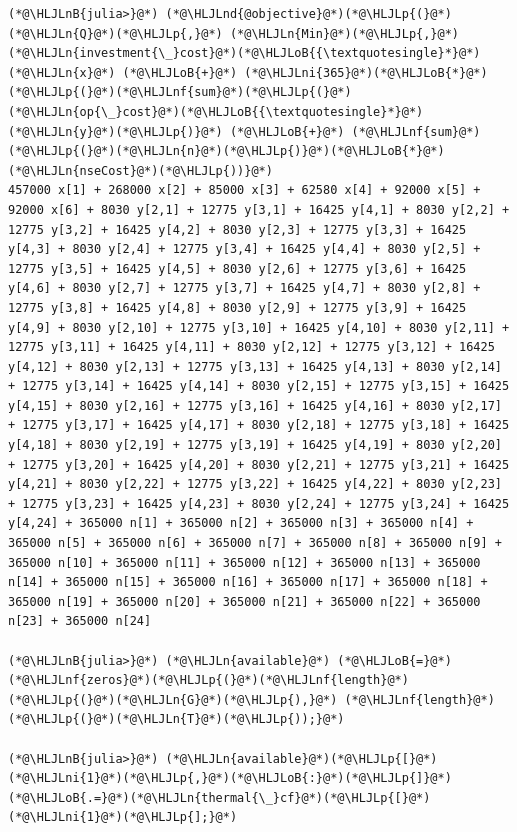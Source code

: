 \documentclass[12pt,a4paper]{article}
\newcommand{\HLJLn}[1]{#1}
\newcommand{\HLJLnd}[1]{\textcolor[RGB]{214,102,97}{#1}}
\newcommand{\HLJLnf}[1]{\textcolor[RGB]{66,102,213}{#1}}
\newcommand{\HLJLnB}[1]{\textcolor[RGB]{59,151,46}{#1}}
\newcommand{\HLJLni}[1]{\textcolor[RGB]{59,151,46}{#1}}
\newcommand{\HLJLoB}[1]{\textcolor[RGB]{102,102,102}{\textbf{#1}}}
\newcommand{\HLJLp}[1]{#1}
\begin{document}
\begin{lstlisting}
(*@\HLJLnB{julia>}@*) (*@\HLJLnd{@objective}@*)(*@\HLJLp{(}@*)(*@\HLJLn{Q}@*)(*@\HLJLp{,}@*) (*@\HLJLn{Min}@*)(*@\HLJLp{,}@*) (*@\HLJLn{investment{\_}cost}@*)(*@\HLJLoB{{\textquotesingle}*}@*) (*@\HLJLn{x}@*) (*@\HLJLoB{+}@*) (*@\HLJLni{365}@*)(*@\HLJLoB{*}@*)(*@\HLJLp{(}@*)(*@\HLJLnf{sum}@*)(*@\HLJLp{(}@*)(*@\HLJLn{op{\_}cost}@*)(*@\HLJLoB{{\textquotesingle}*}@*)(*@\HLJLn{y}@*)(*@\HLJLp{)}@*) (*@\HLJLoB{+}@*) (*@\HLJLnf{sum}@*)(*@\HLJLp{(}@*)(*@\HLJLn{n}@*)(*@\HLJLp{)}@*)(*@\HLJLoB{*}@*)(*@\HLJLn{nseCost}@*)(*@\HLJLp{))}@*)
457000 x[1] + 268000 x[2] + 85000 x[3] + 62580 x[4] + 92000 x[5] + 92000 x[6] + 8030 y[2,1] + 12775 y[3,1] + 16425 y[4,1] + 8030 y[2,2] + 12775 y[3,2] + 16425 y[4,2] + 8030 y[2,3] + 12775 y[3,3] + 16425 y[4,3] + 8030 y[2,4] + 12775 y[3,4] + 16425 y[4,4] + 8030 y[2,5] + 12775 y[3,5] + 16425 y[4,5] + 8030 y[2,6] + 12775 y[3,6] + 16425 y[4,6] + 8030 y[2,7] + 12775 y[3,7] + 16425 y[4,7] + 8030 y[2,8] + 12775 y[3,8] + 16425 y[4,8] + 8030 y[2,9] + 12775 y[3,9] + 16425 y[4,9] + 8030 y[2,10] + 12775 y[3,10] + 16425 y[4,10] + 8030 y[2,11] + 12775 y[3,11] + 16425 y[4,11] + 8030 y[2,12] + 12775 y[3,12] + 16425 y[4,12] + 8030 y[2,13] + 12775 y[3,13] + 16425 y[4,13] + 8030 y[2,14] + 12775 y[3,14] + 16425 y[4,14] + 8030 y[2,15] + 12775 y[3,15] + 16425 y[4,15] + 8030 y[2,16] + 12775 y[3,16] + 16425 y[4,16] + 8030 y[2,17] + 12775 y[3,17] + 16425 y[4,17] + 8030 y[2,18] + 12775 y[3,18] + 16425 y[4,18] + 8030 y[2,19] + 12775 y[3,19] + 16425 y[4,19] + 8030 y[2,20] + 12775 y[3,20] + 16425 y[4,20] + 8030 y[2,21] + 12775 y[3,21] + 16425 y[4,21] + 8030 y[2,22] + 12775 y[3,22] + 16425 y[4,22] + 8030 y[2,23] + 12775 y[3,23] + 16425 y[4,23] + 8030 y[2,24] + 12775 y[3,24] + 16425 y[4,24] + 365000 n[1] + 365000 n[2] + 365000 n[3] + 365000 n[4] + 365000 n[5] + 365000 n[6] + 365000 n[7] + 365000 n[8] + 365000 n[9] + 365000 n[10] + 365000 n[11] + 365000 n[12] + 365000 n[13] + 365000 n[14] + 365000 n[15] + 365000 n[16] + 365000 n[17] + 365000 n[18] + 365000 n[19] + 365000 n[20] + 365000 n[21] + 365000 n[22] + 365000 n[23] + 365000 n[24]

(*@\HLJLnB{julia>}@*) (*@\HLJLn{available}@*) (*@\HLJLoB{=}@*) (*@\HLJLnf{zeros}@*)(*@\HLJLp{(}@*)(*@\HLJLnf{length}@*)(*@\HLJLp{(}@*)(*@\HLJLn{G}@*)(*@\HLJLp{),}@*) (*@\HLJLnf{length}@*)(*@\HLJLp{(}@*)(*@\HLJLn{T}@*)(*@\HLJLp{));}@*)

(*@\HLJLnB{julia>}@*) (*@\HLJLn{available}@*)(*@\HLJLp{[}@*)(*@\HLJLni{1}@*)(*@\HLJLp{,}@*)(*@\HLJLoB{:}@*)(*@\HLJLp{]}@*) (*@\HLJLoB{.=}@*)(*@\HLJLn{thermal{\_}cf}@*)(*@\HLJLp{[}@*)(*@\HLJLni{1}@*)(*@\HLJLp{];}@*)


\end{lstlisting}
\end{document}
